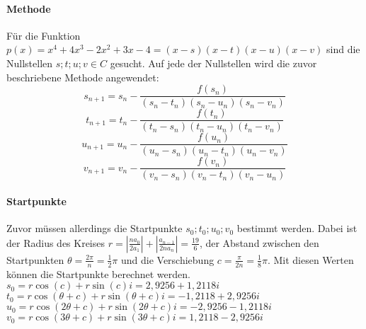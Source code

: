 \documentclass[12pt]{article}
\begin{document}
\paragraph{Methode}
Für die Funktion $p(x) = x^4 + 4x^3 - 2x^2 + 3x - 4 = (x-s)(x-t)(x-u)(x-v)$ sind die Nullstellen $s;t;u;v \in C$ gesucht. Auf jede der Nullstellen wird die zuvor beschriebene Methode angewendet:
\begin{equation*}
    s_{n+1} = s_n-\frac{f(s_n)}{(s_n-t_n)(s_n-u_n)(s_n-v_n)}
\end{equation*}
\begin{equation*}
    t_{n+1} = t_n-\frac{f(t_n)}{(t_n-s_n)(t_n-u_n)(t_n-v_n)}
\end{equation*}
\begin{equation*}
    u_{n+1} = u_n-\frac{f(u_n)}{(u_n-s_n)(u_n-t_n)(u_n-v_n)}
\end{equation*}
\begin{equation*}
    v_{n+1} = v_n-\frac{f(v_n)}{(v_n-s_n)(v_n-t_n)(v_n-u_n)}
\end{equation*}
\paragraph{Startpunkte}
Zuvor müssen allerdings die Startpunkte $s_0;t_0;u_0;v_0$ bestimmt werden. Dabei ist der Radius des Kreises $r = |\frac{na_0}{2a_1}| + |\frac{a_{n-1}}{2na_n}| = \frac{19}{6}$, der Abstand zwischen den Startpunkten $\theta = \frac{2\pi}{n} = \frac{1}{2}\pi$ und die Verschiebung $c = \frac{\pi}{2n} = \frac{1}{8}\pi$. Mit diesen Werten können die Startpunkte berechnet werden. \\
$s_0 = r \cos(c) + r \sin(c)i = 2,9256 + 1,2118i$ \\
$t_0 = r \cos(\theta+c) + r \sin(\theta+c)i = -1,2118 + 2,9256i$ \\
$u_0 = r \cos(2\theta+c) + r \sin(2\theta+c)i = -2,9256 - 1,2118i$ \\
$v_0 = r \cos(3\theta+c) + r \sin(3\theta+c)i = 1,2118 - 2,9256i$
\end{document}
